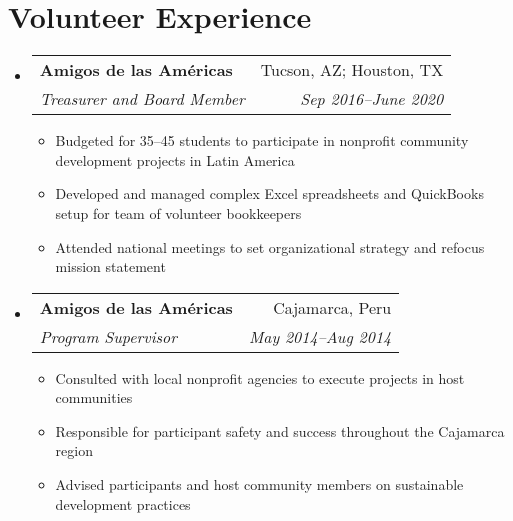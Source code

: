 \documentclass[a4paper,20pt]{article}
\makeatletter
\newcommand{\resumeSubheading}[4]{
  \vspace{-1pt}\item
    \begin{tabular*}{0.97\textwidth}{l@{\extracolsep{\fill}}r}
      \textbf{#1} & #2 \\
      \textit{#3} & \textit{#4} \\
    \end{tabular*}\vspace{-5pt}
}
\newcommand{\resumeSubHeadingListStart}{\begin{itemize}[leftmargin=*]}
\newcommand{\resumeSubHeadingListEnd}{\end{itemize}}
\newcommand{\resumeItemListStart}{\begin{itemize}}
\newcommand{\resumeItemListEnd}{\end{itemize}\vspace{-5pt}}
\makeatother
\begin{document}
\section{Volunteer Experience}
  \resumeSubHeadingListStart
  \resumeSubheading
		{Amigos de las Am\'{e}ricas}{Tucson, AZ; Houston, TX}
		{Treasurer and Board Member}{Sep 2016–June 2020}
		\resumeItemListStart
        \item 
          {Budgeted for 35–45 students to participate in nonprofit community development projects in Latin America}
        \item
          {Developed and managed complex Excel spreadsheets and QuickBooks setup for team of volunteer bookkeepers}
        \item {Attended national meetings to set organizational strategy and refocus mission statement}
		\resumeItemListEnd
\vspace{5pt}
\resumeSubheading
		{Amigos de las Am\'{e}ricas}{Cajamarca, Peru}
		{Program Supervisor}{May 2014–Aug 2014}
		\resumeItemListStart
        \item 
          {Consulted with local nonprofit agencies to execute projects in host communities}
        \item
          {Responsible for participant safety and success throughout the Cajamarca region}
        \item {Advised participants and host community members on sustainable development practices}
		\resumeItemListEnd
\resumeSubHeadingListEnd
\end{document}
